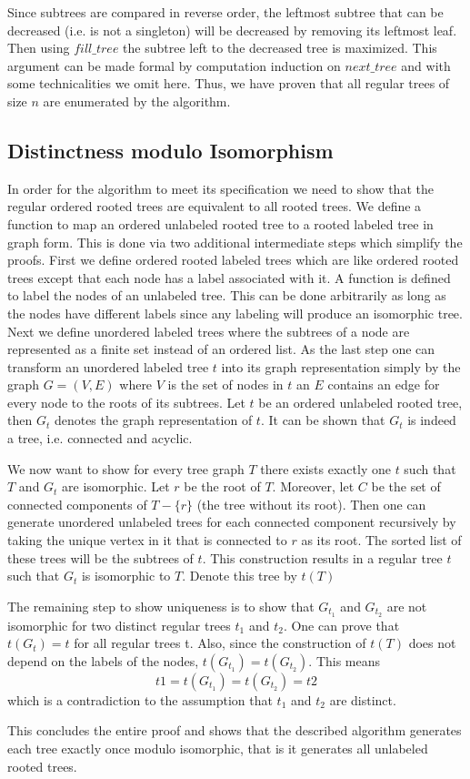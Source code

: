 Since subtrees are compared in reverse order, the leftmost subtree that can be decreased (i.e. is not a singleton) will be decreased by removing its leftmost leaf.
Then using $fill\_tree$ the subtree left to the decreased tree is maximized.
This argument can be made formal by computation induction on $next\_tree$ and with some technicalities we omit here.
Thus, we have proven that all regular trees of size $n$ are enumerated by the algorithm.

\subsection{Distinctness modulo Isomorphism}

In order for the algorithm to meet its specification we need to show that the regular ordered rooted trees are equivalent to all rooted trees.
We define a function to map an ordered unlabeled rooted tree to a rooted labeled tree in graph form.
This is done via two additional intermediate steps which simplify the proofs.
First we define ordered rooted labeled trees which are like ordered rooted trees except that each node has a label associated with it.
A function is defined to label the nodes of an unlabeled tree.
This can be done arbitrarily as long as the nodes have different labels since any labeling will produce an isomorphic tree.
Next we define unordered labeled trees where the subtrees of a node are represented as a finite set instead of an ordered list.
As the last step one can transform an unordered labeled tree $t$ into its graph representation simply by the graph $G = (V,E)$ where $V$ is the set of nodes in $t$ an $E$ contains an edge for every node to the roots of its subtrees.
Let $t$ be an ordered unlabeled rooted tree, then $G_t$ denotes the graph representation of $t$.
It can be shown that $G_t$ is indeed a tree, i.e. connected and acyclic.

We now want to show for every tree graph $T$ there exists exactly one $t$ such that $T$ and $G_t$ are isomorphic.
Let $r$ be the root of $T$.
Moreover, let $C$ be the set of connected components of $T - \{r\}$ (the tree without its root). 
Then one can generate unordered unlabeled trees for each connected component recursively by taking the unique vertex in it that is connected to $r$ as its root.
The sorted list of these trees will be the subtrees of $t$.
This construction results in a regular tree $t$ such that $G_t$ is isomorphic to $T$.
Denote this tree by $t(T)$

The remaining step to show uniqueness is to show that $G_{t_1}$ and $G_{t_2}$ are not isomorphic for two distinct regular trees $t_1$ and $t_2$.
One can prove that $t(G_t) = t$ for all regular trees t.
Also, since the construction of $t(T)$ does not depend on the labels of the nodes, $t(G_{t_1}) = t(G_{t_2})$.
This means
\[
    t1 = t(G_{t_1}) = t(G_{t_2}) = t2
\]
which is a contradiction to the assumption that $t_1$ and $t_2$ are distinct.

This concludes the entire proof and shows that the described algorithm generates each tree exactly once modulo isomorphic, that is it generates all unlabeled rooted trees.

